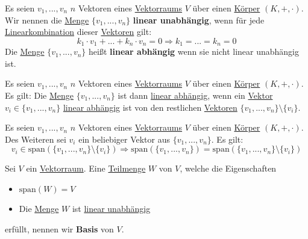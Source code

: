 \documentclass[../../main.tex]{subfiles}
\begin{document}
	\begin{definition}
		\label{def:LineareAbhängigkeitMenge}
		\label{def:LineareUnabhängigkeitMenge}
		Es seien $v_1,...,v_n$ $n$ Vektoren eines \hyperref[def:Vektorraum]{Vektorraums} $V$ über einen \hyperref[def:Körper]{Körper} $(K,+,\cdot)$. Wir nennen die \hyperref[def:Menge]{Menge} $\{v_1,...,v_n\}$ \textbf{linear unabhängig}, wenn für jede \hyperref[def:Linearkombination]{Linearkombination} dieser \hyperref[def:Vektor]{Vektoren} gilt: $$k_1 \cdot v_1 + ... + k_n \cdot v_n = 0 \Rightarrow k_1 = ... = k_n = 0$$ Die \hyperref[def:Menge]{Menge} $\{v_1,...,v_n\}$ heißt \textbf{linear abhängig} wenn sie nicht linear unabhängig ist. 
	\end{definition}

	\begin{theorem}
		Es seien $v_1,...,v_n$ $n$ Vektoren eines \hyperref[def:Vektorraum]{Vektorraums} $V$ über einen \hyperref[def:Körper]{Körper} $(K,+,\cdot)$. Es gilt: Die \hyperref[def:Menge]{Menge} $\{v_1,...,v_n\}$ ist dann \hyperref[def:LineareAbhängigkeitMenge]{linear abhängig}, wenn ein \hyperref[def:Vektor]{Vektor} $v_i \in\{v_1,...,v_n\}$ \hyperref[def:LineareAbhängigkeit]{linear abhängig} ist von den restlichen \hyperref[def:Vektor]{Vektoren} $\{v_1,...,v_n\}\setminus \{v_i\}$. 
	\end{theorem}

	\begin{theorem}
		Es seien $v_1,...,v_n$ $n$ Vektoren eines \hyperref[def:Vektorraum]{Vektorraums} $V$ über einen \hyperref[def:Körper]{Körper} $(K,+,\cdot)$. Des Weiteren sei $v_i$ ein beliebiger Vektor aus $\{v_1,...,v_n\}$. Es gilt: $$v_i \in \textrm{span}(\{v_1,...,v_n\}\setminus\{v_i\}) \Rightarrow \textrm{span}(\{v_1,...,v_n\}) = \textrm{span}(\{v_1,...,v_n\}\setminus\{v_i\})$$
	\end{theorem}

	\begin{definition}[Basis]
		\label{def:Basis}
		Sei $V$ ein \hyperref[def:Vektorraum]{Vektorraum}. Eine \hyperref[def:Teilmenge]{Teilmenge} $W$ von $V$, welche die Eigenschaften
		\begin{itemize}
			\item $\textrm{span}(W) = V$
			\item Die \hyperref[def:Menge]{Menge} $W$ ist \hyperref[def:LineareUnabhängigkeitMenge]{linear unabhängig}
		\end{itemize}
		erfüllt, nennen wir \textbf{Basis} von $V$. 
	\end{definition}
\end{document}
